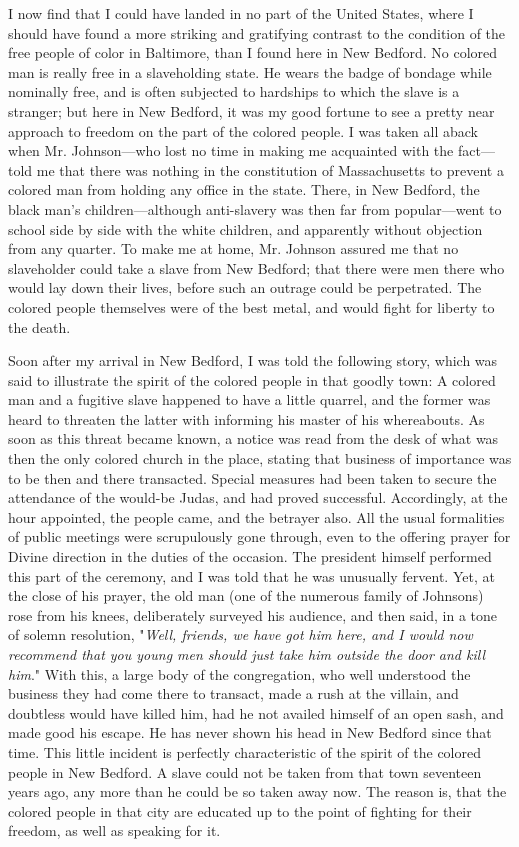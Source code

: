 I now find that I could have landed in no part of the United States,
where I should have found a more striking and gratifying contrast to the
condition of the free people of color in Baltimore, than I found here in
New Bedford. No colored man is really free in a slaveholding state. He
wears the badge of bondage while nominally free, and is often subjected
to hardships to which the slave is a stranger; but here in New Bedford,
it was my good fortune to see a pretty near approach to freedom on the
part of the {\protect\hypertarget{347}{}{}}colored people. I was taken
all aback when Mr. Johnson---who lost no time in making me acquainted
with the fact---told me that there was nothing in the constitution of
Massachusetts to prevent a colored man from holding any office in the
state. There, in New Bedford, the black man's children---although
anti-slavery was then far from popular---went to school side by side
with the white children, and apparently without objection from any
quarter. To make me at home, Mr. Johnson assured me that no slaveholder
could take a slave from New Bedford; that there were men there who would
lay down their lives, before such an outrage could be perpetrated. The
colored people themselves were of the best metal, and would fight for
liberty to the death.

Soon after my arrival in New Bedford, I was told the following story,
which was said to illustrate the spirit of the colored people in that
goodly town: A colored man and a fugitive slave happened to have a
little quarrel, and the former was heard to threaten the latter with
informing his master of his whereabouts. As soon as this threat became
known, a notice was read from the desk of what was then the only colored
church in the place, stating that business of importance was to be then
and there transacted. Special measures had been taken to secure the
attendance of the would-be Judas, and had proved successful.
Accordingly, at the hour appointed, the people came, and the betrayer
also. All the usual formalities of public meetings were scrupulously
gone through, even to the offering prayer for Divine direction in the
duties of the occasion. The president
{\protect\hypertarget{348}{}{}}himself performed this part of the
ceremony, and I was told that he was unusually fervent. Yet, at the
close of his prayer, the old man (one of the numerous family of
Johnsons) rose from his knees, deliberately surveyed his audience, and
then said, in a tone of solemn resolution, "\emph{Well, friends, we have
got him here, and I would now recommend that you young men should just
take him outside the door and kill him}." With this, a large body of the
congregation, who well understood the business they had come there to
transact, made a rush at the villain, and doubtless would have killed
him, had he not availed himself of an open sash, and made good his
escape. He has never shown his head in New Bedford since that time. This
little incident is perfectly characteristic of the spirit of the colored
people in New Bedford. A slave could not be taken from that town
seventeen years ago, any more than he could be so taken away now. The
reason is, that the colored people in that city are educated up to the
point of fighting for their freedom, as well as speaking for it.

